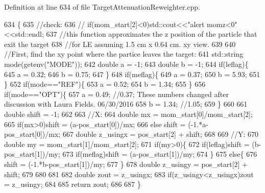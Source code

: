 Definition at line 634 of file Target\-Attenuation\-Reweighter.\-cpp.


\begin{DoxyCode}
634                                                                                                            
            \{
635     \textcolor{comment}{//check:}
636     \textcolor{comment}{//    if(mom\_start[2]<0)std::cout<<"alert momz<0"<<std::endl;}
637     \textcolor{comment}{//this function approximates the z position of the particle that exit the target}
638     \textcolor{comment}{//for LE assuming 1.5 cm x 0.64 cm. xy view.}
639     
640     \textcolor{comment}{//First, find the xy point where the partice leaves the target:}
641     std::string mode(getenv(\textcolor{stringliteral}{"MODE"}));
642     \textcolor{keywordtype}{double} a = -1;
643     \textcolor{keywordtype}{double} b = -1;
644     \textcolor{keywordflow}{if}(leflag)\{
645       a = 0.32;
646       b = 0.75;
647     \}
648     \textcolor{keywordflow}{if}(meflag)\{
649       a = 0.37;
650       b = 5.93;
651     \}    
652     \textcolor{keywordflow}{if}(mode==\textcolor{stringliteral}{"REF"})\{
653       a = 0.52;
654       b = 1.34;
655     \}
656     \textcolor{keywordflow}{if}(mode==\textcolor{stringliteral}{"OPT"})\{
657       a = 0.49;  \textcolor{comment}{//0.37; These numbers changed after discussion with Laura Fields. 06/30/2016}
658       b = 1.34; \textcolor{comment}{//1.05;      }
659     \}
660     
661     \textcolor{keywordtype}{double} shift = -1;
662     
663     \textcolor{comment}{//X:}
664     \textcolor{keywordtype}{double} mx  = mom\_start[0]/mom\_start[2];
665     \textcolor{keywordflow}{if}(mx>0)shift = (a-pos\_start[0])/mx;
666     \textcolor{keywordflow}{else} shift = (-1.*a-pos\_start[0])/mx;    
667     \textcolor{keywordtype}{double} z\_usingx = pos\_start[2] + shift;
668     
669     \textcolor{comment}{//Y:}
670     \textcolor{keywordtype}{double} my  = mom\_start[1]/mom\_start[2];
671     \textcolor{keywordflow}{if}(my>0)\{
672       \textcolor{keywordflow}{if}(leflag)shift = (b-pos\_start[1])/my;
673       \textcolor{keywordflow}{if}(meflag)shift = (a-pos\_start[1])/my;
674     \}
675     \textcolor{keywordflow}{else}\{
676       shift = (-1.*b-pos\_start[1])/my;        
677     \}
678     \textcolor{keywordtype}{double} z\_usingy = pos\_start[2] + shift;  
679     
680        
681     
682     \textcolor{keywordtype}{double} zout = z\_usingx;
683     \textcolor{keywordflow}{if}(z\_usingy<z\_usingx)zout = z\_usingy;
684     
685     \textcolor{keywordflow}{return} zout;
686     
687   \}
\end{DoxyCode}
